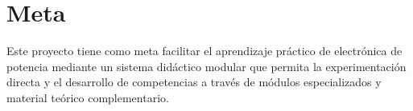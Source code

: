\section{Meta}
\justifying

Este proyecto tiene como meta facilitar el aprendizaje práctico de electrónica de potencia mediante un sistema didáctico modular que permita la experimentación directa y el desarrollo de competencias a través de módulos especializados y material teórico complementario. 
